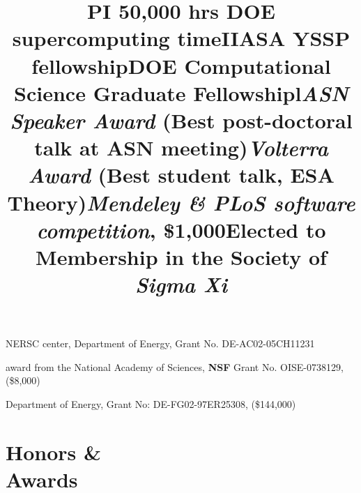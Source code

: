 \documentclass[margin]{res}
\begin{document}
\begin{resume}
\title{PI 50,000 hrs \textbf{DOE} supercomputing time}
\begin{position} 
  NERSC center, Department of Energy, Grant No. DE-AC02-05CH11231
  \vspace{-.25cm}
\end{position}

\title{\textbf{IIASA} YSSP fellowship}
\begin{position} 
  award from the National Academy of Sciences, \textbf{NSF} Grant No. OISE-0738129, (\$8,000)
  \vspace{-.25cm}
\end{position}

\title{\textbf{DOE} Computational Science Graduate Fellowship}
\begin{position} 
  Department of Energy, Grant No: DE-FG02-97ER25308, (\$144,000)
  \vspace{-.25cm}
\end{position}


\section{Honors \& \\ Awards}
\begin{format}
\title{l}\\
\body
\end{format}

\title{\emph{ASN Speaker Award} (Best post-doctoral talk at ASN meeting)}
\begin{position} \vspace{-.8cm} \end{position}

\title{\emph{Volterra Award} (Best student talk, ESA Theory)}
\begin{position} \vspace{-.8cm} \end{position}

\title{\emph{Mendeley \& PLoS software competition}, \$1,000}
\begin{position} \vspace{-.8cm} \end{position}

\title{Elected to Membership in the Society of \emph{Sigma Xi}}
\begin{position}   \vspace{-.8cm} \end{position}


\end{resume}
\end{document}
